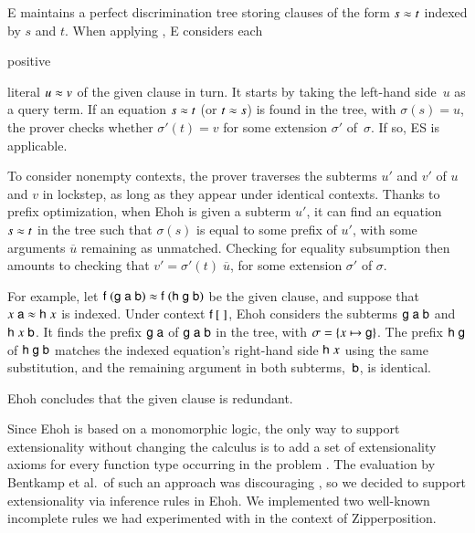 E maintains a perfect discrimination tree storing clauses of the form $s
\approx t$ indexed by $s$ and $t$.
When applying ,
E considers each \begin{rep}positive \end{rep}literal $u \approx v$ of the given
clause in turn. It starts by taking the left-hand side~$u$ as a query term.
If an equation $s \approx t$ (or $t \approx s$) is found in the tree, with $\sigma(s)
= u$, the prover checks whether $\sigma'(t) = v$ for some extension $\sigma'$ of~$\sigma$. If so, ES is
applicable.
\begin{rep}\par\end{rep}
To consider nonempty contexts, the prover traverses the subterms $u'$ and $v'$ of
$u$ and $v$ in lockstep, as long as they appear under identical
contexts. Thanks to prefix optimization, when Ehoh is given a subterm $u'$,
it can find an equation $s \approx t$ in the tree such that
$\sigma(s)$ is equal to some prefix of $u'$, with some arguments
$\overline{u}$ remaining as unmatched. Checking for equality subsumption
%
then amounts to checking that $v' = \sigma'(t) \; \overline{u}$,
for some extension $\sigma'$ of $\sigma$.

For example, let
$\mathsf{f} \; (\mathsf{g} \; \mathsf{a} \; \mathsf{b}) \approx \mathsf{f} \; (\mathsf{h} \; \mathsf{g} \; \mathsf{b})$
be the given clause,
and suppose that $x \; \mathsf{a} \approx \mathsf{h} \; x$ is indexed.
Under context $\mathsf{f}\>[\phantom{.}]$, Ehoh considers the subterms
$\mathsf{g} \; \mathsf{a} \; \mathsf{b}$ and $\mathsf{h} \; x \; \mathsf{b}$. It finds the
prefix $\mathsf{g} \; \mathsf{a}$ of $\mathsf{g} \; \mathsf{a} \; \mathsf{b}$ in the
%
tree, with $\sigma = \{x \mapsto\nobreak \mathsf{g}\}$.
The prefix $\mathsf{h} \; \mathsf{g}$ of $\mathsf{h} \; \mathsf{g} \; \mathsf{b}$ matches the
indexed equation's right-hand side $\mathsf{h} \; x$ using the same substitution,
and the remaining argument in both subterms,~$\mathsf{b}$, is identical.
\begin{rep}Ehoh concludes that the given clause is redundant.\end{rep}


Since Ehoh is based on a mono\-morphic logic, the only way to support
extensionality without changing the calculus is to add a set of extensionality
axioms for every function type occurring in the problem
\cite[Sect.~3.1]{bbcw-21-lfho}. The evaluation by Bentkamp et al.\ of such
an approach was discouraging \cite[Sect.~6]{bbcw-21-lfho}, so we decided to
support extensionality via inference rules in Ehoh. We implemented two well-known
incomplete rules we had experimented with in the context of Zipperposition.

